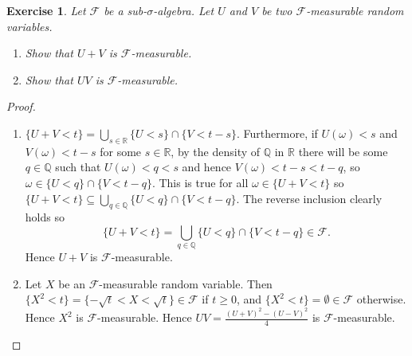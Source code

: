\documentclass{article}
\newtheorem{exercise}[theorem]{Exercise}
\begin{document}
\begin{exercise}
Let $\mathcal{F}$ be a sub-$\sigma$-algebra. Let $U$ and $V$ be two $\mathcal{F}$-measurable random variables.
\begin{enumerate}
    \item[(a)] Show that $U+V$ is $\mathcal{F}$-measurable.
    \item[(b)] Show that $UV$ is $\mathcal{F}$-measurable.
\end{enumerate}
\end{exercise}
\begin{proof}
\begin{enumerate}
    \item[(a)] $\{U+V<t\}=\bigcup_{s\in\mathbb{R}}\{U<s\}\cap\{V<t-s\}$. Furthermore, if $U(\omega)<s$ and $V(\omega)<t-s$ for some $s\in\mathbb{R}$, by the density of $\mathbb{Q}$ in $\mathbb{R}$ there will be some $q\in\mathbb{Q}$ such that $U(\omega)<q<s$ and hence $V(\omega)<t-s<t-q$, so $\omega\in\{U<q\}\cap\{V<t-q\}$. This is true for all $\omega\in\{U+V<t\}$ so $\{U+V<t\}\subseteq\bigcup_{q\in\mathbb{Q}}\{U<q\}\cap\{V<t-q\}$. The reverse inclusion clearly holds so \[\{U+V<t\}=\bigcup_{q\in\mathbb{Q}}\{U<q\}\cap\{V<t-q\}\in\mathcal{F}.\] Hence $U+V$ is $\mathcal{F}$-measurable.
    \item[(b)] Let $X$ be an $\mathcal{F}$-measurable random variable. Then $\{X^2<t\}=\{-\sqrt{t}<X<\sqrt{t}\}\in\mathcal{F}$ if $t\geq 0$, and $\{X^2<t\}=\emptyset\in\mathcal{F}$ otherwise. Hence $X^2$ is $\mathcal{F}$-measurable.
    Hence $UV=\frac{(U+V)^2-(U-V)^2}{4}$ is $\mathcal{F}$-measurable.
\end{enumerate}
\end{proof}
\end{document}
